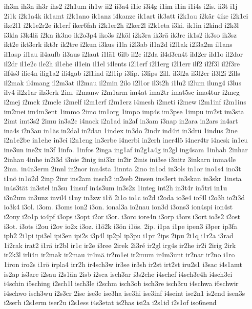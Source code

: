 {ih3m
ih3n
ih3r
ihs2
i2h1um
ih1w
ii2
ii3a4
i1ie
i3i4g
i1im
i1in
i1i4s
i2is.
ii3t
i1j
2i1k
i2k1a4k
ik1amt
i2k1ano
ik1anz
i4kanze
ik1art
ik3att
i2k1au
i2kär
4ike
i2k1ei
ike2l1
i2k1e2r2e
ik1erf
iker6fah
i2k1er2h
i2ker2l
i2k1eta
i3ki.
ik1in
i2kind
i2k3l
i3kla
i3k4lä
i2kn
ik3no
ik2o3p4
iko3s
i2köl
i2k3ra
ik3rä
ik3re
ik1s2
ik3so
ik3sz
ikt2e
ikt3erk
ikt3r
ik2tre
i2kun
i3kus
i1la
i2l3ab
il1a2d
i2l1ak
i2l3a2m
il1ans
il1asp
il1au
il4aufb
il3aus
i2laut
i1lä1
6ilb
il2c
il2da
il4d3en4t
ild2er
ild1o
il2dor
il2dr
il1e2c
ile2h
il1ehe
il1ein
il1el
i4lents
i2l1erf
i2l1erg
i2l1err
ilf2
il2f3l
il2f3re
ilf4s3
ilie4n
ilig1a2
ili4gab
i2l1ind
i2l1ip
i3lip.
i3lips
2ill.
il3l2a
il3l2er
il3l2i
2ills
il2mak
il4mang
il2m3at
il2mau
il2min
2ilo
i2l1or
il3t2h
i1lu2
i2lum
ilung4
i3lus
ilv4
il2z1ar
ilz3erk
2im.
i2manw
i2m1arm
im4at
ima2tr
imat5sc
ima4tur
i2meg
i2mej
i2mek
i2mele
i2melf
i2m1erf
i2m1erz
i4mesh
i2meti
i2mew
i2m1inf
i2m1ins
im2mei
im4m3ent
1immo
2imo
im1org
1impo
imp4s
im3pse
1impu
im2st
im3sta
2imt
imt3s2
2imu
in3a2c
i4nack
i2n1ad
in2af
in3am
i3nap
in2ara
in2ars
in4art
ina4s
i2n3au
in1äs
in2dal
in2dan
1index
in3do
2indr
ind4ri
in3drü
1indus
2ine
i2n1e2be
in1ehe
in3ei
i2n1eng
in3erbe
i4nerbi
in2erh
iner4lö
i4ner4tr
i4nesk
in1eu
ine3un
ine2x
in3f
1info.
1infos
2inga
ing1af
in2g1a4g
in2gl
ing4sam
1inhab
2inhar
2inhau
4inhe
in2i3d
i3nie
2inig
ini3kr
in2ir
2inis
ini3se
i3nitz
3inkarn
inma4le
2inn.
in4n3erm
2innl
in2nor
inn4sta
1innta
2ino
in1od
in3ols
in1or
ino1s4
ino3t
i1nö
in1ö2d
2inp
2inr
ins2am
insch2
in2seb
2insen
ins3ert
in3skan
in3skr
1insta
in4s3tät
in3stel
in3su
1insuf
in4s3um
in3s2z
1integ
int2h
in3t4r
in5tri
in1u
i3n2um
in3unz
invil4
i1ny
in3zw
i1ñ
2i1o
io1c
io2d
i2oda
io3e4
iof4l
i2o3h
io2i3d
io3k4
i3ol.
i3om.
i3oms
ion2
i3on.
ional3a
io2nau
ion3d
i3ons3
ion4spi
ion4st
i2ony
i2o1p
io4pf
i3ops
i3opt
i2or
i3or.
i3orc
iore4n
i3orp
i3ors
i3ort
io3s2
i2ost
i3ot.
i3ots
i2ou
i2ov
io2x
i3oz.
i1ö2k
i3ön
i1ös.
2ip.
i1pa
i1pe
ipen3
i3per
ip3fa
iph2
2i1pi
ipi3el
ipi3en
ipi2s
i3p4l
ip2pl
ip3pu
i1pr
2ips
2ipu
2i1q
i1r2a
i3rad
1i2rak
irat2
i1rä
ir2bl
ir1c
ir2e
i3ree
2irek
2i3ré
ir2gl
irg4s
ir2he
ir2i
2irig
2irk
ir2k3l
irli4n
ir2mak
ir2mau
ir4mä
ir2m1ei
ir2mum
ir4m3unt
ir2nar
ir2no
i1ro
1iron
iro2s
i1rö
irpla4
irr2h
ir4sch3w
ir3se
ir3sh
ir2st
irt2st
iru2s1
i3sac
i4s1amt
is2ap
is3are
i2sau
i2s1än
2isb
i2sca
isch3ar
i3s2che
i4schef
i4sch3e4h
i4sch3ei
i4schin
i5sching
i2sch1l
isch3le
i2schm
isch3ob
isch3re
isch3ru
i4schwa
i6schwir
i4schwo
isch3wu
i2s3cr
2ise
ise3e
ise3ha
ise3hi
ise3inf
i4seint
ise2n1
is2end
isen3s
i2serh
i2s1erm
iser2u
i2s1ess
i4s3etat
is2has
isi2a
i2s1id
i2s1of
iso6nend
}
